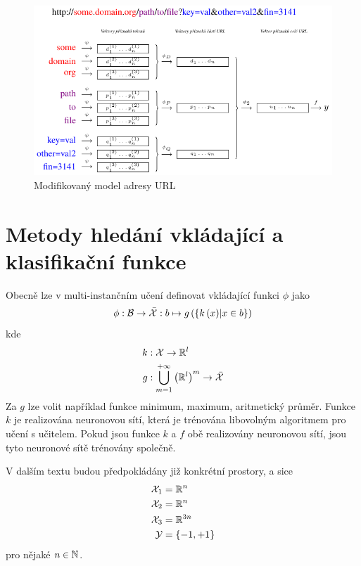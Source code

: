 \begin{figure}[h]
	\centering
	\includegraphics{images/model_modified_MIL/model_modified_MIL.pdf}
	\caption{Modifikovaný model adresy URL}\label{url_model_modified_MIL}
\end{figure}

\section{Metody hledání vkládající a klasifikační funkce}
Obecně lze v multi-instančním učení definovat vkládající funkci \( \phi \) jako
\begin{equation}\label{netpooling}
	\phi : \mathcal B \to \bar{\mathcal X} : b \mapsto g \left( \left\{ k \left( x \right) \middle| x \in b \right\} \right)
\end{equation}
kde
\begin{align*}
	k &: \mathcal X \to \mathbb R^l \\
	g &: \bigcup_{m = 1}^{+ \infty} \left( \mathbb R^l \right)^m \to \bar{\mathcal X}
\end{align*}
Za \( g \) lze volit například funkce minimum, maximum, aritmetický průměr. Funkce \( k \) je realizována neuronovou sítí, která je trénována libovolným algoritmem pro učení s učitelem. Pokud jsou funkce \( k \) a \( f \) obě realizovány neuronovou sítí, jsou tyto neuronové sítě trénovány společně.

V dalším textu budou předpokládány již konkrétní prostory, a sice
\begin{align*}
	\mathcal X_1 &= \mathbb R^n \\
	\mathcal X_2 &= \mathbb R^n \\
	\mathcal X_3 &= \mathbb R^{3n} \\
	\mathcal Y &= \left\{ -1, +1 \right\}
\end{align*}
pro nějaké \( n \in \mathbb N \).

